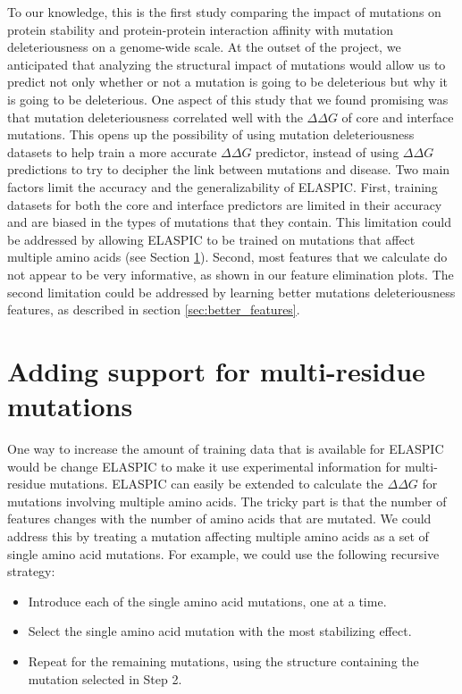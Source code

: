 To our knowledge, this is the first study comparing the impact of mutations on protein stability and protein-protein interaction affinity with mutation deleteriousness on a genome-wide scale. At the outset of the project, we anticipated that analyzing the structural impact of mutations would allow us to predict not only whether or not a mutation is going to be deleterious but why it is going to be deleterious. One aspect of this study that we found promising was that mutation deleteriousness correlated well with the $\Delta \Delta G$ of core and interface mutations. This opens up the possibility of using mutation deleteriousness datasets to help train a more accurate $\Delta \Delta G$ predictor, instead of using $\Delta \Delta G$ predictions to try to decipher the link between mutations and disease. Two main factors limit the accuracy and the generalizability of ELASPIC. First, training datasets for both the core and interface predictors are limited in their accuracy and are biased in the types of mutations that they contain. This limitation could be addressed by allowing ELASPIC to be trained on mutations that affect multiple amino acids (see Section \ref{sec:more_data}). Second, most features that we calculate do not appear to be very informative, as shown in our feature elimination plots. The second limitation could be addressed by learning better mutations deleteriousness features, as described in section \ref{sec:better_features}.


\section{Adding support for multi-residue mutations} \label{sec:more_data}

One way to increase the amount of training data that is available for ELASPIC would be change ELASPIC to make it use experimental information for multi-residue mutations. ELASPIC can easily be extended to calculate the $\Delta \Delta G$ for mutations involving multiple amino acids. The tricky part is that the number of features changes with the number of amino acids that are mutated. We could address this by treating a mutation affecting multiple amino acids as a set of single amino acid mutations. For example, we could use the following recursive strategy:

\begin{itemize}
	\itemsep0em
    \item Introduce each of the single amino acid mutations, one at a time.
    \item Select the single amino acid mutation with the most stabilizing effect.
    \item Repeat for the remaining mutations, using the structure containing the mutation selected in Step 2.
\end{itemize}

